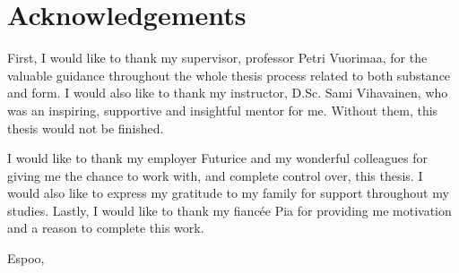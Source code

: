 
\chapter*{Acknowledgements}

First, I would like to thank my supervisor, professor Petri Vuorimaa, for the valuable guidance throughout the whole thesis process related to both substance and form. I would also like to thank my instructor, D.Sc. Sami Vihavainen, who was an inspiring, supportive and insightful mentor for me. Without them, this thesis would not be finished.

I would like to thank my employer Futurice and my wonderful colleagues for giving me the chance to work with, and complete control over, this thesis. I would also like to express my gratitude to my family for support throughout my studies. Lastly, I would like to thank my fiancée Pia for providing me motivation and a reason to complete this work.

\vskip 10mm

\noindent Espoo, \DATE
\vskip 5mm
\noindent\AUTHOR